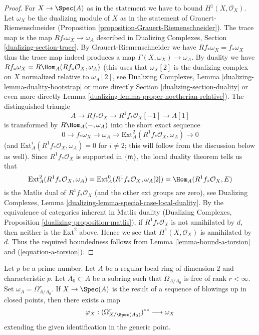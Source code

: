 \begin{proof}
For $X \to \Spec(A)$ as in the statement we have to bound
$H^1(X, \mathcal{O}_X)$. Let $\omega_X$ be the dualizing module
of $X$ as in the statement of Grauert-Riemenschneider
(Proposition \ref{proposition-Grauert-Riemenschneider}).
The trace map is the map $Rf_*\omega_X \to \omega_A$ described
in Dualizing Complexes, Section \ref{dualizing-section-trace}.
By Grauert-Riemenschneider we have $Rf_*\omega_X = f_*\omega_X$
thus the trace map indeed produces a map $\Gamma(X, \omega_X) \to \omega_A$.
By duality we have $Rf_*\omega_X = R\Hom_A(Rf_*\mathcal{O}_X, \omega_A)$
(this uses that $\omega_X[2]$ is the dualizing complex on $X$
normalized relative to $\omega_A[2]$,
see Dualizing Complexes, Lemma \ref{dualizing-lemma-duality-bootstrap}
or more directly Section \ref{dualizing-section-duality} or even more directly
Lemma \ref{dualizing-lemma-proper-noetherian-relative}).
The distinguished triangle
$$
A \to Rf_*\mathcal{O}_X \to R^1f_*\mathcal{O}_X[-1] \to A[1]
$$
is transformed by $R\Hom_A(-, \omega_A)$ into the short exact sequence
$$
0 \to f_*\omega_X \to \omega_A \to
\text{Ext}_A^2(R^1f_*\mathcal{O}_X, \omega_A) \to 0
$$
(and $\text{Ext}_A^i(R^1f_*\mathcal{O}_X, \omega_A) = 0$ for $i \not = 2$;
this will follow from the discussion below as well).
Since $R^1f_*\mathcal{O}_X$ is supported in $\{\mathfrak m\}$, the
local duality theorem tells us that
$$
\text{Ext}_A^2(R^1f_*\mathcal{O}_X, \omega_A) =
\text{Ext}_A^0(R^1f_*\mathcal{O}_X, \omega_A[2]) =
\Hom_A(R^1f_*\mathcal{O}_X, E)
$$
is the Matlis dual of $R^1f_*\mathcal{O}_X$ (and the other
ext groups are zero), see
Dualizing Complexes, Lemma \ref{dualizing-lemma-special-case-local-duality}.
By the equivalence of categories inherent in Matlis duality
(Dualizing Complexes, Proposition \ref{dualizing-proposition-matlis}),
if $R^1f_*\mathcal{O}_X$ is not annihilated by $d$,
then neither is the $\text{Ext}^2$ above. Hence we see that
$H^1(X, \mathcal{O}_X)$ is annihilated by $d$. Thus the required
boundedness follows from Lemma \ref{lemma-bound-a-torsion} and
(\ref{equation-a-torsion}).
\end{proof}

\begin{lemma}
\label{lemma-compare-differentials-dualizing}
Let $p$ be a prime number.
Let $A$ be a regular local ring of dimension $2$ and characteristic $p$.
Let $A_0 \subset A$ be a subring such that $\Omega_{A/A_0}$ is free
of rank $r < \infty$. Set $\omega_A = \Omega^r_{A/A_0}$. If $X \to \Spec(A)$
is the result of a sequence of blowings up in closed points, then
there exists a map
$$
\varphi_X : (\Omega^r_{X/\Spec(A_0)})^{**} \longrightarrow \omega_X
$$
extending the given identification in the generic point.
\end{lemma}

